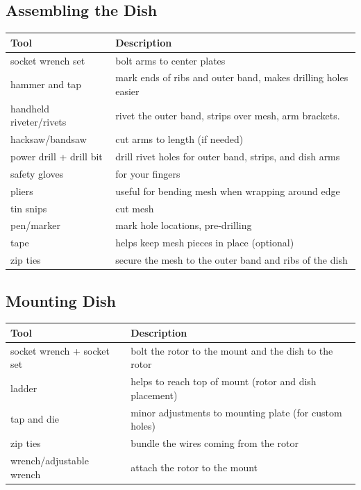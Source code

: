 \documentclass[11pt]{article} %
\begin{document}
\subsection{Assembling the Dish}
\begin{tabular}{| l | p{10cm} |}
\hline
\textbf{Tool} & \textbf{Description} \\ \hline \hline
socket wrench set & bolt arms to center plates\\ \hline
hammer and tap & mark ends of ribs and outer band, makes drilling holes easier\\ \hline
handheld riveter/rivets & rivet the outer band, strips over mesh, arm brackets.\\ \hline
hacksaw/bandsaw & cut arms to length (if needed) \\ \hline
power drill + drill bit & drill rivet holes for outer band, strips, and dish arms\\ \hline
safety gloves & for your fingers\\ \hline
pliers & useful for bending mesh when wrapping around edge\\ \hline
tin snips & cut mesh\\ \hline
pen/marker & mark hole locations, pre-drilling\\ \hline
tape & helps keep mesh pieces in place (optional) \\ \hline
zip ties & secure the mesh to the outer band and ribs of the dish \\ \hline
\end{tabular}


\subsection{Mounting Dish}
\begin{tabular}{| l | p{10cm} |}
\hline
\textbf{Tool} & \textbf{Description} \\ \hline \hline
socket wrench + socket set & bolt the rotor to the mount and the dish to the rotor \\ \hline
ladder & helps to reach top of mount (rotor and dish placement) \\ \hline
tap and die & minor adjustments to mounting plate (for custom holes) \\ \hline
zip ties & bundle the wires coming from the rotor \\ \hline
wrench/adjustable wrench & attach the rotor to the mount \\ \hline
\end{tabular}
\end{document}
